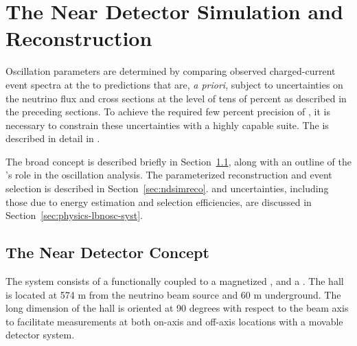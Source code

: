 \section{The Near Detector Simulation and Reconstruction}\label{sec:nu-osc-06}\label{sec:physics-lbnosc-ND}


Oscillation parameters are determined by comparing observed charged-current event spectra at the  to predictions that are, {\em a priori}, subject to uncertainties on the neutrino flux and cross sections at the level of tens of percent as described in the preceding sections. To achieve the required few percent precision of , it is necessary to constrain these uncertainties with a highly capable  suite. The  is described in detail in \introchnd.

The broad  concept is described briefly in Section~\ref{sec:ndconcept}, along with an outline of the 's role in the oscillation analysis. The parameterized reconstruction and event selection is described in Section~\ref{sec:ndsimreco}. %
 and  uncertainties, including those due to energy estimation and selection efficiencies, are discussed in Section~\ref{sec:physics-lbnosc-syst}.  

\subsection{The Near Detector Concept}
\label{sec:ndconcept}

The   system consists of a  functionally coupled to a magnetized , and a . The  hall is located at  574 m from the neutrino beam source and 60 m underground. The long dimension of the hall is oriented at 90 degrees with respect to the beam axis to facilitate measurements at both on-axis and off-axis locations with a movable detector system. 

